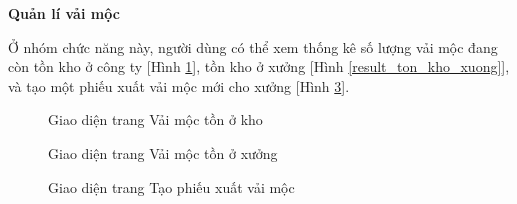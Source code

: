 \textbf{Quản lí vải mộc}

Ở nhóm chức năng này, người dùng có thể xem thống kê số lượng vải mộc đang còn tồn kho ở công ty [Hình \ref{result_moc_ton_kho}], tồn kho ở xưởng [Hình \ref{result_ton_kho_xuong}], và tạo một phiếu xuất vải mộc mới cho xưởng [Hình \ref{result_tao_phieu_xuat}].

\begin{figure}[H]
    \begin{center}
        \caption{Giao diện trang Vải mộc tồn ở kho}
        \label{result_moc_ton_kho}
    \end{center}
\end{figure}

\begin{figure}[H]
    \begin{center}
        \caption{Giao diện trang Vải mộc tồn ở xưởng}
        \label{result_moc_ton_xuong}
    \end{center}
\end{figure}

\begin{figure}[H]
    \begin{center}
        \caption{Giao diện trang Tạo phiếu xuất vải mộc}
        \label{result_tao_phieu_xuat}
    \end{center}
\end{figure}

